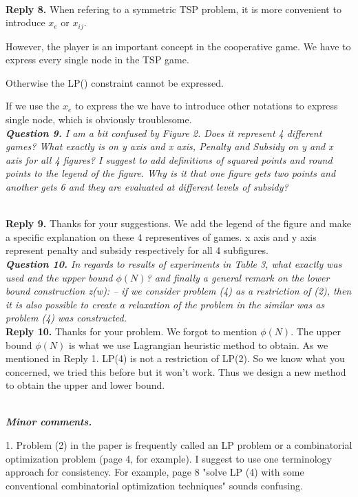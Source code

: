 \documentclass[11pt]{article}
\begin{document}
\\[2mm]
\noindent \textbf{Reply 8.}
When refering to a symmetric TSP problem, it is more convenient to introduce $x_e$ or $x_{ij}$.

However, the player is an important concept in the cooperative game.
We have to express every single node in the TSP game.

Otherwise the LP() constraint cannot be expressed.

If we use the $x_e$ to express the
we have to introduce other notations to express single node, which is obviously troublesome.
\\[4mm]


\noindent \textit{\textbf{Question 9.}
I am a bit confused by Figure 2. Does it represent 4 different games? What exactly is on y axis and x axis, Penalty and Subsidy on y and x axis for all 4 figures? I suggest to add definitions of squared points and round points to the legend of the figure. Why is it that one figure gets two points and another gets 6 and they are evaluated at different levels of subsidy?}

\\[2mm]
\noindent \textbf{Reply 9.}
Thanks for your suggestions.
We add the legend of the figure and make a specific explanation on these 4 representives of games.
x axis and y axis represent penalty and subsidy respectively for all 4 subfigures.
\\[4mm]


\noindent \textit{\textbf{Question 10.}
In regards to results of experiments in Table 3, what exactly was used and the upper bound $\phi(N)$? and finally a general remark on the lower bound construction z(w):
-- if we consider problem (4) as a restriction of (2), then it is also possible to create a relaxation of the problem in the similar was as problem (4) was constructed.}
\\[2mm]
\noindent \textbf{Reply 10.}
Thanks for your problem. We forgot to mention $\phi(N)$.
The upper bound $\phi(N)$ is what we use Lagrangian heuristic method to obtain.
As we mentioned in Reply 1. LP(4) is not a restriction of LP(2). So we know what you concerned, we tried this before but it won't work. Thus we design a new method to obtain the upper and lower bound.

\\[4mm]


\noindent \textit{\textbf{Minor comments.}}

1. Problem (2) in the paper is frequently called an LP problem or a combinatorial optimization problem (page 4, for example). I suggest to use one terminology approach for consistency. For example, page 8 "solve LP (4) with some conventional combinatorial optimization techniques" sounds confusing.
\end{document}
